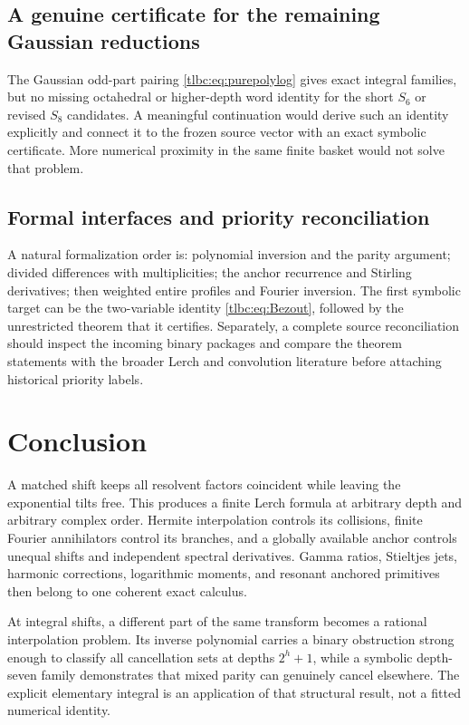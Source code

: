 \documentclass[11pt,letterpaper]{article}
\numberwithin{equation}{section}
\theoremstyle{definition}\newtheorem{definition}[theorem]{Definition}
\theoremstyle{remark}\newtheorem{remark}[theorem]{Remark}
\begin{document}
\subsection{A genuine certificate for the remaining Gaussian reductions}
The Gaussian odd-part pairing \eqref{tlbc:eq:purepolylog} gives exact integral families, but no missing octahedral or higher-depth word identity for the short $S_6$ or revised $S_8$ candidates. A meaningful continuation would derive such an identity explicitly and connect it to the frozen source vector with an exact symbolic certificate. More numerical proximity in the same finite basket would not solve that problem.

\subsection{Formal interfaces and priority reconciliation}
A natural formalization order is: polynomial inversion and the parity argument; divided differences with multiplicities; the anchor recurrence and Stirling derivatives; then weighted entire profiles and Fourier inversion. The first symbolic target can be the two-variable identity \eqref{tlbc:eq:Bezout}, followed by the unrestricted theorem that it certifies. Separately, a complete source reconciliation should inspect the incoming binary packages and compare the theorem statements with the broader Lerch and convolution literature before attaching historical priority labels.

\section*{Conclusion}
A matched shift keeps all resolvent factors coincident while leaving the exponential tilts free. This produces a finite Lerch formula at arbitrary depth and arbitrary complex order. Hermite interpolation controls its collisions, finite Fourier annihilators control its branches, and a globally available anchor controls unequal shifts and independent spectral derivatives. Gamma ratios, Stieltjes jets, harmonic corrections, logarithmic moments, and resonant anchored primitives then belong to one coherent exact calculus.

At integral shifts, a different part of the same transform becomes a rational interpolation problem. Its inverse polynomial carries a binary obstruction strong enough to classify all cancellation sets at depths $2^h+1$, while a symbolic depth-seven family demonstrates that mixed parity can genuinely cancel elsewhere. The explicit elementary integral is an application of that structural result, not a fitted numerical identity.
\end{document}
